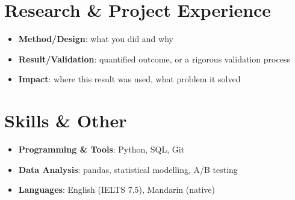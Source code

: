 \documentclass{my-resume}
\begin{document}
\section{Research \& Project Experience}
\begin{itemize}[parsep=0.2ex]
  \item \textbf{Method/Design}: what you did and why
  \item \textbf{Result/Validation}: quantified outcome, or a rigorous validation process
  \item \textbf{Impact}: where this result was used, what problem it solved
\end{itemize}

\section{Skills \& Other}
\entrySkillsSep
\begin{itemize}[parsep=0.2ex]
  \item \textbf{Programming \& Tools}: Python, SQL, Git
  \item \textbf{Data Analysis}: pandas, statistical modelling, A/B testing
  \item \textbf{Languages}: English (IELTS 7.5), Mandarin (native)
\end{itemize}
\end{document}

